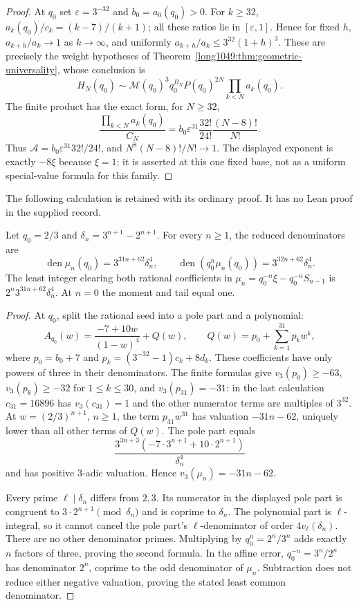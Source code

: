 \begin{proof}
At $q_0$ set $\varepsilon=3^{-32}$ and $b_0=a_0(q_0)>0$.  For $k\ge32$,
$a_k(q_0)/c_k=(k-7)/(k+1)$; all these ratios lie in
$[\varepsilon,1]$.  Hence for fixed $h$,
$a_{k+h}/a_k\to1$ as $k\to\infty$, and uniformly
$a_{k+h}/a_k\le3^{32}(1+h)^3$.
These are precisely the weight hypotheses of
Theorem~\ref{long1049:thm:geometric-universality}, whose conclusion is
\[
 H_N(q_0)\sim\mathcal M(q_0)^3q_0^{B_N}P(q_0)^{2N}
                  \prod_{k<N}a_k(q_0).
\]
The finite product has the exact form, for $N\ge32$,
\[
 \frac{\prod_{k<N}a_k(q_0)}{C_N}
 =b_0\varepsilon^{31}\frac{32!}{24!}\frac{(N-8)!}{N!}.
\]
Thus $\mathcal A=b_0\varepsilon^{31}32!/24!$, and
$N^8(N-8)!/N!\to1$.  The displayed exponent is exactly $-8\xi$
because $\xi=1$; it is asserted at this one fixed base, not as a
uniform special-value formula for this family.
\end{proof}

The following calculation is retained with its ordinary proof. It has
no Lean proof in the supplied record.

\begin{remark}
\label{long1049:thm:calibrated-denominators}
Let $q_0=2/3$ and $\delta_n=3^{n+1}-2^{n+1}$.  For every $n\ge1$,
the reduced denominators are
\[
 \operatorname{den}\mu_n(q_0)=3^{31n+62}\delta_n^4,
 \qquad
 \operatorname{den}(q_0^n\mu_n(q_0))=3^{32n+62}\delta_n^4.
\]
The least integer clearing both rational coefficients in
$\mu_n=q_0^{-n}\xi-q_0^{-n}S_{n-1}$ is
$2^n3^{31n+62}\delta_n^4$.  At $n=0$ the moment and tail equal one.
\end{remark}

\begin{proof}
At $q_0$, split the rational seed into a pole part and a polynomial:
\[
 A_{q_0}(w)=\frac{-7+10w}{(1-w)^4}+Q(w),\qquad
 Q(w)=p_0+\sum_{k=1}^{31}p_kw^k,
\]
where $p_0=b_0+7$ and
$p_k=(3^{-32}-1)c_k+8d_k$.  These coefficients have only powers
of three in their denominators.  The finite formulas give
$v_3(p_0)\ge-63$, $v_3(p_k)\ge-32$ for $1\le k\le30$, and
$v_3(p_{31})=-31$: in the last calculation $c_{31}=16896$ has
$v_3(c_{31})=1$ and the other numerator terms are multiples of
$3^{32}$.  At $w=(2/3)^{n+1}$, $n\ge1$, the term
$p_{31}w^{31}$ has valuation $-31n-62$, uniquely lower than all
other terms of $Q(w)$.  The pole part equals
\[
 \frac{3^{3n+3}(-7\cdot3^{n+1}+10\cdot2^{n+1})}{\delta_n^4}
\]
and has positive $3$-adic valuation.  Hence
$v_3(\mu_n)=-31n-62$.

Every prime $\ell\mid\delta_n$ differs from $2,3$.
Its numerator in the displayed pole part is congruent to
$3\cdot2^{n+1}\pmod{\delta_n}$ and is coprime to $\delta_n$.
The polynomial part is $\ell$-integral, so it cannot cancel the
pole part's $\ell$-denominator of order $4v_\ell(\delta_n)$.
There are no other denominator primes.  Multiplying by
$q_0^n=2^n/3^n$ adds exactly $n$ factors of three, proving the second
formula.  In the affine error, $q_0^{-n}=3^n/2^n$ has denominator
$2^n$, coprime to the odd denominator of $\mu_n$.  Subtraction does
not reduce either negative valuation, proving the stated least
common denominator.
\end{proof}

